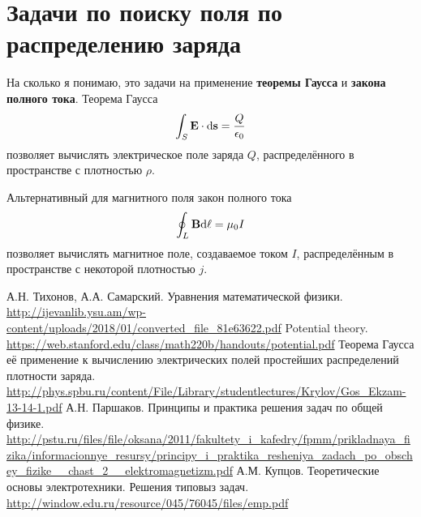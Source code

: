 \documentclass[12pt]{report}
\begin{document}
\section{Задачи по поиску поля по распределению заряда}
На сколько я понимаю, это задачи на применение \textbf{теоремы Гаусса} и \textbf{закона полного тока}. 
Теорема Гаусса
\[
\int_S \mathbf{E}\cdot \mathrm d\mathbf{s} = \frac{Q}{\epsilon_0}
\]
позволяет вычислять электрическое поле заряда  $Q$, распределённого в пространстве с плотностью $\rho$.

Альтернативный для магнитного поля закон полного тока
\[
\oint_L\mathbf{B}\mathrm d\mathbf{\ell} = \mu_0 I
\]
позволяет вычислять магнитное поле, создаваемое током $I$, распределённым в пространстве с некоторой плотностью $j$.

\begin{thebibliography}{0}
	А.Н. Тихонов, А.А. Самарский.
	Уравнения математической физики.
	\url{http://ijevanlib.ysu.am/wp-content/uploads/2018/01/converted_file_81e63622.pdf}
	Potential theory.
	\url{https://web.stanford.edu/class/math220b/handouts/potential.pdf}
	Теорема Гаусса  её применение к вычислению электрических полей простейших распределений плотности заряда.
	\url{http://phys.spbu.ru/content/File/Library/studentlectures/Krylov/Gos_Ekzam-13-14-1.pdf}
	А.Н. Паршаков. Принципы и практика решения задач по общей физике.
	\url{http://pstu.ru/files/file/oksana/2011/fakultety_i_kafedry/fpmm/prikladnaya_fizika/informacionnye_resursy/principy_i_praktika_resheniya_zadach_po_obschey_fizike__chast_2__elektromagnetizm.pdf}
	А.М. Купцов. Теоретические основы электротехники. Решения типовыз задач.
	\url{http://window.edu.ru/resource/045/76045/files/emp.pdf}
\end{thebibliography}
\end{document}
